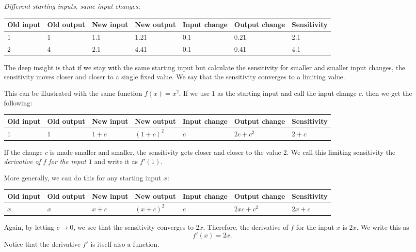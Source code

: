 \documentclass{math-deane}
\begin{document}
{\em Different starting inputs, same input changes:}\\
\begin{tabular}{|p{0.5in}|p{0.5in}|p{0.5in}|p{0.5in}|p{0.5in}|p{1in}|p{1in}|}
\hline
Old input&Old output&New input& New output & Input change &
Output change & Sensitivity \\ \hline \hline
1 & 1 & 1.1 & 1.21 & 0.1 & 0.21 & 2.1\\ \hline
2 & 4 & 2.1 & 4.41 & 0.1 & 0.41 & 4.1 \\ \hline
\end{tabular}

The deep insight is that if we stay with the same starting input but calculate the sensitivity for smaller and smaller input changes, the sensitivity moves closer and closer to a single fixed value. We say that the sensitivity converges to a limiting value.

This can be illustrated with the same function $f(x)=x^2$. If we use $1$ as the starting input and call the input change $c$, then we get the following:

\begin{tabular}{|p{0.5in}|p{0.5in}|p{0.5in}|p{0.5in}|p{0.5in}|p{1in}|p{1in}|}
\hline
Old input&Old output&New input& New output & Input change &
Output change & Sensitivity \\ \hline \hline
$1$ & $1$ & $1+c$ & $(1+c)^2$ & $c$ & $2c+c^2$ & $2+c$ \\ \hline
\end{tabular}

If the change $c$ is made smaller and smaller, the sensitivity gets closer and closer to the value $2$. We call this limiting sensitivity the {\em derivative of $f$ for the input $1$} and write it as $f'(1)$.

More generally, we can do this for any starting input $x$:

\begin{tabular}{|p{0.5in}|p{0.5in}|p{0.5in}|p{0.5in}|p{0.5in}|p{1in}|p{1in}|}
\hline
Old input&Old output&New input& New output & Input change &
Output change & Sensitivity \\ \hline \hline
$x$ & $x$ & $x+c$ & $(x+c)^2$ & $c$ & $2xc+c^2$ & $2x+c$ \\ \hline
\end{tabular}

Again, by letting $c \rightarrow 0$, we see that the sensitivity converges to $2x$. Therefore, the derivative of $f$ for the input $x$ is $2x$. We write this as
\[ f'(x) = 2x. \]
Notice that the derivative $f'$ is itself also a function.
\end{document}
